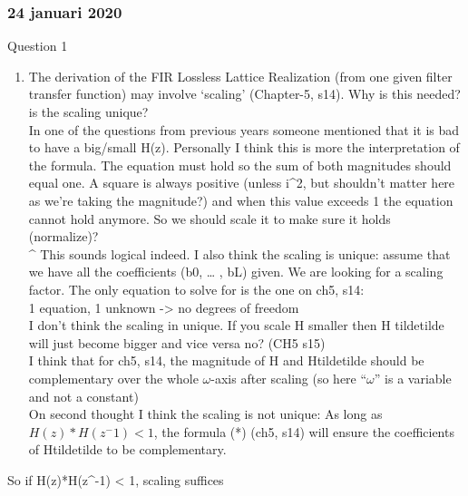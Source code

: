 \documentclass[
  a4paper,
  ,captions=tableheading
]{scrartcl}
\providecommand{\tightlist}{%
  \setlength{\itemsep}{0pt}\setlength{\parskip}{0pt}}
\begin{document}
\subsubsection{\texorpdfstring{\textbf{24 januari
2020}}{24 januari 2020}}\label{januari-2020}

Question 1

\begin{enumerate}
\def\labelenumi{\arabic{enumi}.}
\tightlist
\item
  The derivation of the FIR Lossless Lattice Realization (from one given
  filter transfer function) may involve `scaling' (Chapter-5, s14). Why
  is this needed? is the scaling unique?\\
  In one of the questions from previous years someone mentioned that it
  is bad to have a big/small H(z). Personally I think this is more the
  interpretation of the formula. The equation must hold so the sum of
  both magnitudes should equal one. A square is always positive (unless
  i\^{}2, but shouldn't matter here as we're taking the magnitude?) and
  when this value exceeds 1 the equation cannot hold anymore. So we
  should scale it to make sure it holds (normalize)?\\
  \^{} This sounds logical indeed. I also think the scaling is unique:
  assume that we have all the coefficients (b0, \ldots{} , bL) given. We
  are looking for a scaling factor. The only equation to solve for is
  the one on ch5, s14:\\
  1 equation, 1 unknown -\textgreater{} no degrees of freedom\\
  I don't think the scaling in unique. If you scale H smaller then H
  tildetilde will just become bigger and vice versa no? (CH5 s15)\\
  I think that for ch5, s14, the magnitude of H and Htildetilde should
  be complementary over the whole \(\omega\)-axis after scaling (so here
  ``\(\omega\)'' is a variable and not a constant)\\
  On second thought I think the scaling is not unique: As long as
  \(H(z)*H(z^-1) < 1\), the formula (*) (ch5, s14) will ensure the
  coefficients of Htildetilde to be complementary.
\end{enumerate}

So if H(z)*H(z\^{}-1) \textless{} 1, scaling suffices
\end{document}
